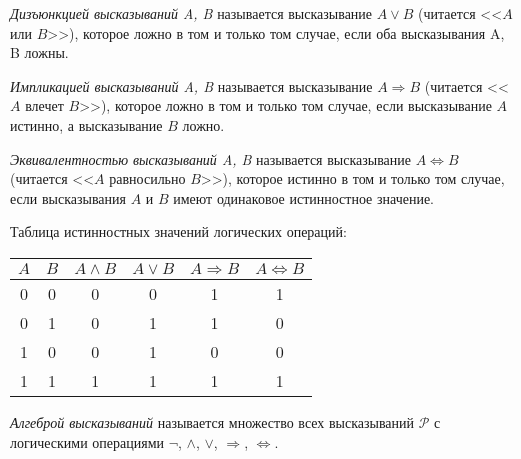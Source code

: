 \begin{definition}
    \textit{Дизъюнкцией высказываний A, B} называется высказывание $A\lor B$ (читается <<$A$ или $B$>>), которое ложно в том и только том случае, если оба высказывания A, B ложны.
\end{definition}

\begin{definition}
    \textit{Импликацией высказываний A, B} называется высказывание $A\Rightarrow B$ (читается <<$A$ влечет $B$>>), которое ложно в том и только том случае, если высказывание $A$ истинно, а высказывание $B$ ложно.
\end{definition}

\begin{definition}
    \textit{Эквивалентностью высказываний A, B} называется высказывание $A\Leftrightarrow B$ (читается <<$A$ равносильно $B$>>), которое истинно в том и только том случае, если высказывания $A$ и $B$ имеют одинаковое истинностное значение.
\end{definition}

Таблица истинностных значений логических операций:
\begin{center}
    \begin{tabular}{|c|c|c|c|c|c|}
        \hline
        $A$ & $B$ & $A\land B$ & $A\lor B$ & $A\Rightarrow B$ & $A\Leftrightarrow B$ \\ \hline
        0   & 0   & 0          & 0         & 1                & 1                    \\ \hline
        0   & 1   & 0          & 1         & 1                & 0                    \\ \hline
        1   & 0   & 0          & 1         & 0                & 0                    \\ \hline
        1   & 1   & 1          & 1         & 1                & 1                    \\ \hline
        \end{tabular}
\end{center}

\begin{definition}
    \textit{Алгеброй высказываний} называется множество всех высказываний $\mathscr{P}$ с логическими операциями $\lnot $, $\land $, $\lor $, $\Rightarrow $, $\Leftrightarrow $.
\end{definition}
